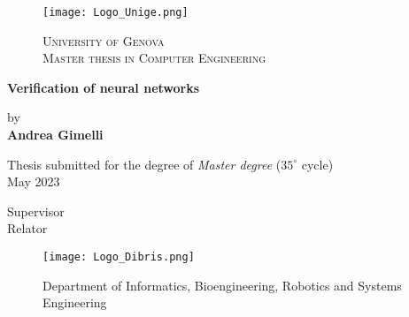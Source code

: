 
\thispagestyle{empty}
\begin{figure}[h!]
 \centering
 \texttt{[image: Logo\_Unige.png]} %
	\begin{center} 
		\Large
		{\textsc{University of Genova}}\\
		  \vspace{0.5em}
		  \large
	         \textsc{Master thesis in Computer Engineering}\\

	\end{center}
\end{figure}



\begin{center} 
	


		\Large
		\textbf{Verification of neural networks} \\
\end{center}

 	\begin{center} 
		by \\
		\vspace{0.5em}
		\textbf{Andrea Gimelli}\\
		\vspace{1em}
	
		
    \vspace{0.5em}
	\vspace{1cm}	
		\normalsize
		Thesis submitted for the degree of \textit{Master degree} ($35^\circ$ cycle) \\
	\vspace{1cm}	
		\normalsize
		May 2023\\ 
	\end{center}
	\vspace{2em}

\vfill


	 \hfill  {Supervisor}	
	\\
	  \hfill  {Relator}	


\vspace{2em}
\vfill
\begin{figure}[h!]
 \centering
 \texttt{[image: Logo\_Dibris.png]}
\begin{center} 
		\small{Department of Informatics, Bioengineering, Robotics and Systems Engineering\\}
	\end{center}
\end{figure}
	


